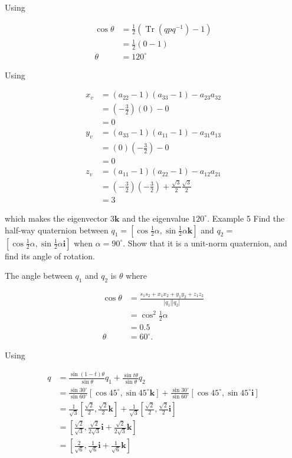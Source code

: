 Using

$$
\begin{aligned}
\cos \theta & =\frac{1}{2}\left(\operatorname{Tr}\left(q p q^{-1}\right)-1\right) \\
& =\frac{1}{2}(0-1) \\
\theta & =120^{\circ}
\end{aligned}
$$

Using

$$
\begin{aligned}
x_{v} & =\left(a_{22}-1\right)\left(a_{33}-1\right)-a_{23} a_{32} \\
& =\left(-\frac{3}{2}\right)(0)-0 \\
& =0 \\
y_{v} & =\left(a_{33}-1\right)\left(a_{11}-1\right)-a_{31} a_{13} \\
& =(0)\left(-\frac{3}{2}\right)-0 \\
& =0 \\
z_{v} & =\left(a_{11}-1\right)\left(a_{22}-1\right)-a_{12} a_{21} \\
& =\left(-\frac{3}{2}\right)\left(-\frac{3}{2}\right)+\frac{\sqrt{3}}{2} \frac{\sqrt{3}}{2} \\
& =3
\end{aligned}
$$

which makes the eigenvector $3 \mathbf{k}$ and the eigenvalue $120^{\circ}$. Example 5 Find the half-way quaternion between $q_{1}=\left[\cos \frac{1}{2} \alpha, \sin \frac{1}{2} \alpha \mathbf{k}\right]$ and $q_{2}=$ $\left[\cos \frac{1}{2} \alpha, \sin \frac{1}{2} \alpha \mathbf{i}\right]$ when $\alpha=90^{\circ}$. Show that it is a unit-norm quaternion, and find its angle of rotation.

The angle between $q_{1}$ and $q_{2}$ is $\theta$ where

$$
\begin{aligned}
\cos \theta & =\frac{s_{1} s_{2}+x_{1} x_{2}+y_{1} y_{2}+z_{1} z_{2}}{\left|q_{1}\right|\left|q_{2}\right|} \\
& =\cos ^{2} \frac{1}{2} \alpha \\
& =0.5 \\
\theta & =60^{\circ} .
\end{aligned}
$$

Using

$$
\begin{aligned}
q & =\frac{\sin (1-t) \theta}{\sin \theta} q_{1}+\frac{\sin t \theta}{\sin \theta} q_{2} \\
& =\frac{\sin 30^{\circ}}{\sin 60^{\circ}}\left[\cos 45^{\circ}, \sin 45^{\circ} \mathbf{k}\right]+\frac{\sin 30^{\circ}}{\sin 60^{\circ}}\left[\cos 45^{\circ}, \sin 45^{\circ} \mathbf{i}\right] \\
& =\frac{1}{\sqrt{3}}\left[\frac{\sqrt{2}}{2}, \frac{\sqrt{2}}{2} \mathbf{k}\right]+\frac{1}{\sqrt{3}}\left[\frac{\sqrt{2}}{2}, \frac{\sqrt{2}}{2} \mathbf{i}\right] \\
& =\left[\frac{\sqrt{2}}{\sqrt{3}}, \frac{\sqrt{2}}{2 \sqrt{3}} \mathbf{i}+\frac{\sqrt{2}}{2 \sqrt{3}} \mathbf{k}\right] \\
& =\left[\frac{2}{\sqrt{6}}, \frac{1}{\sqrt{6}} \mathbf{i}+\frac{1}{\sqrt{6}} \mathbf{k}\right]
\end{aligned}
$$

